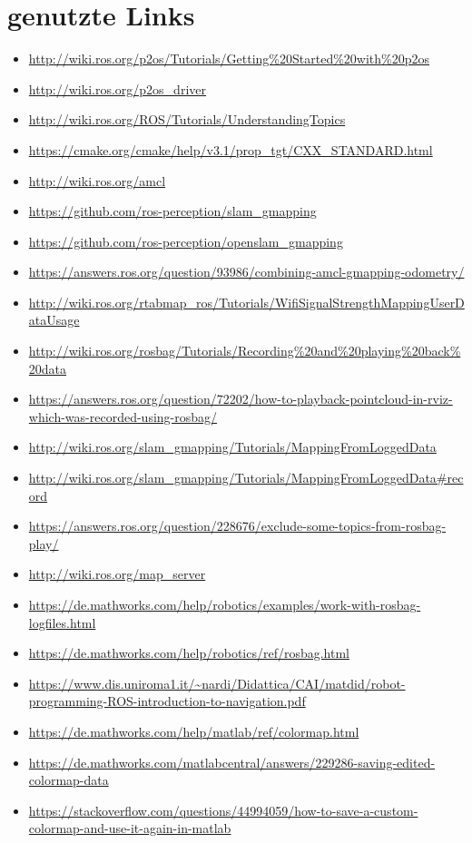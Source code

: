 \documentclass{scrartcl}%
\begin{document}
\section{genutzte Links}
\begin{itemize}
	\item \url{http://wiki.ros.org/p2os/Tutorials/Getting%20Started%20with%20p2os}
		\item \url{http://wiki.ros.org/p2os_driver}
		\item \url{http://wiki.ros.org/ROS/Tutorials/UnderstandingTopics}
		\item \url{https://cmake.org/cmake/help/v3.1/prop_tgt/CXX_STANDARD.html}
		\item \url{http://wiki.ros.org/amcl}
		\item \url{https://github.com/ros-perception/slam\_gmapping}
		\item \url{https://github.com/ros-perception/openslam\_gmapping}
		\item \url{https://answers.ros.org/question/93986/combining-amcl-gmapping-odometry/}
		\item \url{http://wiki.ros.org/rtabmap_ros/Tutorials/WifiSignalStrengthMappingUserDataUsage}
		\item \url{http://wiki.ros.org/rosbag/Tutorials/Recording%20and%20playing%20back%20data}
		\item \url{https://answers.ros.org/question/72202/how-to-playback-pointcloud-in-rviz-which-was-recorded-using-rosbag/}
		\item \url{http://wiki.ros.org/slam_gmapping/Tutorials/MappingFromLoggedData}
		\item \url{http://wiki.ros.org/slam_gmapping/Tutorials/MappingFromLoggedData#record}
		\item \url{https://answers.ros.org/question/228676/exclude-some-topics-from-rosbag-play/}
		\item \url{http://wiki.ros.org/map_server}
		\item \url{https://de.mathworks.com/help/robotics/examples/work-with-rosbag-logfiles.html}
		\item \url{https://de.mathworks.com/help/robotics/ref/rosbag.html}
		\item \url{https://www.dis.uniroma1.it/~nardi/Didattica/CAI/matdid/robot-programming-ROS-introduction-to-navigation.pdf}
		\item \url{https://de.mathworks.com/help/matlab/ref/colormap.html}
		\item \url{https://de.mathworks.com/matlabcentral/answers/229286-saving-edited-colormap-data}
		\item \url{https://stackoverflow.com/questions/44994059/how-to-save-a-custom-colormap-and-use-it-again-in-matlab}
	\end{itemize}
\end{document}
